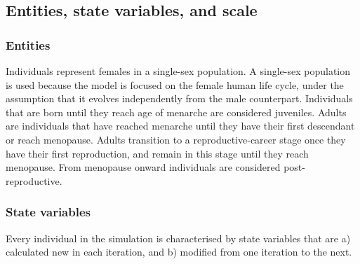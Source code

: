 \documentclass{article}
\begin{document}
\subsection{Entities, state variables, and scale}

\subsubsection{Entities}

Individuals represent females in a single-sex population. A single-sex population is used because the model is focused on the female human life cycle, under the assumption that it evolves independently from the male counterpart. Individuals that are born until they reach age of menarche are considered juveniles. Adults are individuals that have reached menarche until they have their first descendant or reach menopause. Adults transition to a reproductive-career stage once they have their first reproduction, and remain in this stage until they reach menopause. From menopause onward individuals are considered post-reproductive.

\subsubsection{State variables}

Every individual in the simulation is characterised by state variables that are a) calculated new in each iteration, and b) modified from one iteration to the next.
\end{document}
